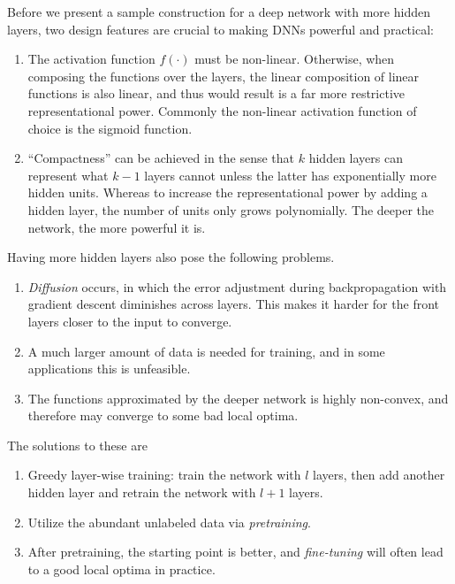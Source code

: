 \documentclass[12pt]{article}  %
\begin{document}
Before we present a sample construction for a deep network with more hidden layers, two design features are crucial to making DNNs powerful and practical:

\begin{enumerate}
	\item The activation function $f(\cdot)$ must be non-linear. Otherwise, when composing the functions over the layers, the linear composition of linear functions is also linear, and thus would result is a far more restrictive representational power. Commonly the non-linear activation function of choice is the sigmoid function.
	\item ``Compactness'' can be achieved in the sense that $k$ hidden layers can represent what $k-1$ layers cannot unless the latter has exponentially more hidden units. Whereas to increase the representational power by adding a hidden layer, the number of units only grows polynomially. The deeper the network, the more powerful it is.
\end{enumerate}


Having more hidden layers also pose the following problems.

\begin{enumerate}
	\item \emph{Diffusion} occurs, in which the error adjustment during backpropagation with gradient descent diminishes across layers. This makes it harder for the front layers closer to the input to converge.
	\item A much larger amount of data is needed for training, and in some applications this is unfeasible.
	\item The functions approximated by the deeper network is highly non-convex, and therefore may converge to some bad local optima.
\end{enumerate}

The solutions to these are

\begin{enumerate}
	\item Greedy layer-wise training: train the network with $l$ layers, then add another hidden layer and retrain the network with $l+1$ layers.
	\item Utilize the abundant unlabeled data via \emph{pretraining}.
	\item After pretraining, the starting point is better, and \emph{fine-tuning} will often lead to a good local optima in practice.
\end{enumerate}
\end{document}
